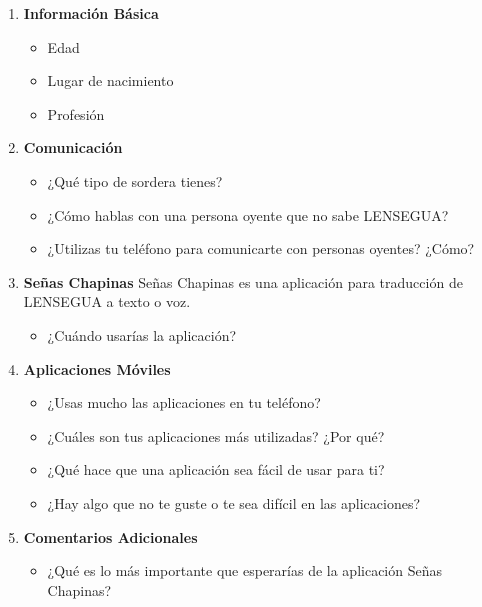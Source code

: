 \begin{enumerate}
    \item \textbf{Información Básica}
    \begin{itemize}
        \item Edad
        \item Lugar de nacimiento
        \item Profesión
    \end{itemize}

    \item \textbf{Comunicación}
    \begin{itemize}
        \item ¿Qué tipo de sordera tienes?
        \item ¿Cómo hablas con una persona oyente que no sabe LENSEGUA?
        \item ¿Utilizas tu teléfono para comunicarte con personas oyentes? ¿Cómo?
    \end{itemize}

    \item \textbf{Señas Chapinas}
    Señas Chapinas es una aplicación para traducción de LENSEGUA a texto o voz.
    \begin{itemize}
        \item ¿Cuándo usarías la aplicación?
    \end{itemize}

    \item \textbf{Aplicaciones Móviles}
    \begin{itemize}
        \item ¿Usas mucho las aplicaciones en tu teléfono?
        \item ¿Cuáles son tus aplicaciones más utilizadas? ¿Por qué?
        \item ¿Qué hace que una aplicación sea fácil de usar para ti?
        \item ¿Hay algo que no te guste o te sea difícil en las aplicaciones?
    \end{itemize}

    \item \textbf{Comentarios Adicionales}
    \begin{itemize}
        \item ¿Qué es lo más importante que esperarías de la aplicación Señas Chapinas?
    \end{itemize}
\end{enumerate}
